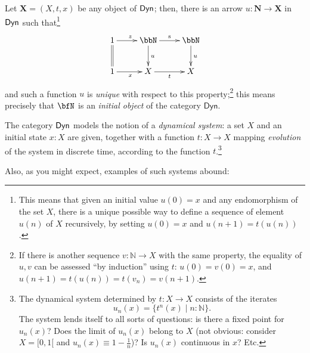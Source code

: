 \documentclass[11pt]{article}
\begin{document}
Let \(\mathbf{X} = (X,t,x)\) be any object of \(\sf Dyn\); then, there is an arrow \(u : \mathbf N \to\mathbf X\) in \(\sf Dyn\) such that\footnote{This means that given an initial value \(u(0)=x\) and any endomorphism of the set $X$, there is a unique possible way to define a sequence of element \(u(n)\) of $X$ recursively, by setting \(u(0) = x\) and $u(n+1) = t(u(n))$.}
\[
	\xymatrix{
	1 \ar@{=}[d] \ar[r]^z & \bbN \ar[r]^{\text{s}} \ar[d]^u & \bbN \ar[d]^u \\
	1 \ar[r]_x & X \ar[r]_t & X
	}
\]
and such a function \(u\) is \emph{unique} with respect to this property;\footnote{If there is another sequence $v : \mathbb N \to X$ with the same property, the equality of $u,v$ can be assessed ``by induction'' using $t$: $u(0)=v(0)=x$, and $u(n+1)=t(u(n))=t(v_n)=v(n+1)$.} this means precisely that \(\bfN\) is an \emph{initial object} of the category \(\textsf{Dyn}\).

The category \(\sf Dyn\) models the notion of a \emph{dynamical system}: a set \(X\) and an initial state \(x : X\) are given, together with a function \(t : X \to X\) mapping \emph{evolution} of the system in discrete time, according to the function \(t\).\footnote{The dynamical system determined by \(t : X \to X\) consists of the iterates
\[
	u_n(x)=\{ t^n(x) \mid n  : \mathbb N\}.
\]
The system lends itself to all sorts of questions: is there a fixed point for \(u_n(x)\)? Does the limit of \(u_n(x)\) belong to \(X\) (not obvious: consider \(X=[0,1[\) and \(u_n(x)\equiv 1-\frac{1}{n}\))? Is \(u_n(x)\) continuous in \(x\)? Etc.}

Also, as you might expect, examples of such systems abound:
\end{document}
